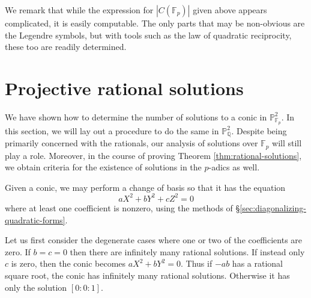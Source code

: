 \documentclass[10pt,a4paper]{amsart}
\numberwithin{equation}{section}
\numberwithin{figure}{section}
\numberwithin{table}{section}
\theoremstyle{definition}
\theoremstyle{plain}
\theoremstyle{remark}
\theoremstyle{plain}
\theoremstyle{definition}
\theoremstyle{plain}
\theoremstyle{plain}
\renewcommand{\P}{\mathbb{P}}
\newcommand{\F}{\mathbb{F}}
\newcommand{\Q}{\mathbb{Q}}
\begin{document}
	\begin{comment}
	Consolidate with Example~4.4!
	\textcolor{red}{Note that if we are in case \eqref{case:0} of Proposition~\ref{prop:counting-P1-solutions}, i.e., if $a=b=c=0$, then $\gamma$ is a residue if and only if $-1$ is. Thus, by Theorem~\ref{thm:diag-P2}, we cannot be in cases \eqref{case:rank2_x^2+y^2=0} or \eqref{case:rank2_x^2+ry^2=0} of Proposition~\ref{prop:counting-P2-solutions} where the projectivized conic has only $1$ solution. Were this the case, Lemma~\ref{lem:relate-solutions-affine-proj} would imply that our affine conic has a negative number (to be exact, $-p$) of solutions!}
	\end{comment}
	
	We remark that while the expression for $|C(\F_p)|$ given above appears complicated, it is easily computable. The only parts that may be non-obvious are the Legendre symbols, but with tools such as the law of quadratic reciprocity, these too are readily determined.
	
	\section{Projective rational solutions}
	\label{sec:rational-soln}
	We have shown how to determine the number of solutions to a conic in $\P^2_{\F_p}$. In this section, we will lay out a procedure to do the same in $\P^2_\Q$. Despite being primarily concerned with the rationals, our analysis of solutions over $\F_p$ will still play a role. Moreover, in the course of proving Theorem \ref{thm:rational-solutions}, we obtain criteria for the existence of solutions in the $p$-adics as well.
	
	Given a conic, we may perform a change of basis so that it has the equation
	\[
	aX^2 + bY^2 + cZ^2 = 0
	\]
	where at least one coefficient is nonzero, using the methods of \S\ref{sec:diagonalizing-quadratic-forms}.
	
	Let us first consider the degenerate cases where one or two of the coefficients are zero. If $b=c=0$ then there are infinitely many rational solutions.
	If instead only $c$ is zero, then the conic becomes $aX^2 + bY^2 = 0$. Thus if $-ab$ has a rational square root, the conic has infinitely many rational solutions. Otherwise it has only the solution $[0:0:1]$.
	
\end{document}
